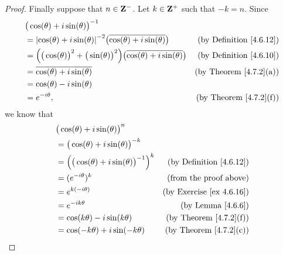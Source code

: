 \begin{proof}
    Finally suppose that \(n \in \mathbf{Z}^-\).
    Let \(k \in \mathbf{Z}^+\) such that \(-k = n\).
    Since
    \begin{align*}
         & \big(\cos(\theta) + i \sin(\theta)\big)^{-1}                                                                                                             \\
         & = \abs{\cos(\theta) + i \sin(\theta)}^{-2} \big(\overline{\cos(\theta) + i \sin(\theta)}\big)                      & \text{(by Definition \ref{4.6.12})} \\
         & = \Big(\big(\cos(\theta)\big)^2 + \big(\sin(\theta)\big)^2\Big) \big(\overline{\cos(\theta) + i \sin(\theta)}\big) & \text{(by Definition \ref{4.6.10})} \\
         & = \overline{\cos(\theta) + i \sin(\theta)}                                                                         & \text{(by Theorem \ref{4.7.2}(a))}  \\
         & = \cos(\theta) - i \sin(\theta)                                                                                                                          \\
         & = e^{- i \theta},                                                                                                  & \text{(by Theorem \ref{4.7.2}(f))}
    \end{align*}
    we know that
    \begin{align*}
         & \big(\cos(\theta) + i \sin(\theta)\big)^n                                                         \\
         & = \big(\cos(\theta) + i \sin(\theta)\big)^{-k}                                                    \\
         & = \Big(\big(\cos(\theta) + i \sin(\theta)\big)^{-1}\Big)^k & \text{(by Definition \ref{4.6.12})}  \\
         & = (e^{- i \theta})^k                                       & \text{(from the proof above)}        \\
         & = e^{k (- i \theta)}                                       & \text{(by Exercise \ref{ex 4.6.16})} \\
         & = e^{- i k \theta}                                         & \text{(by Lemma \ref{4.6.6})}        \\
         & = \cos(k \theta) - i \sin(k \theta)                        & \text{(by Theorem \ref{4.7.2}(f))}   \\
         & = \cos(- k \theta) + i \sin(- k \theta)                    & \text{(by Theorem \ref{4.7.2}(c))}   \\

\end{align*}
\end{proof}
